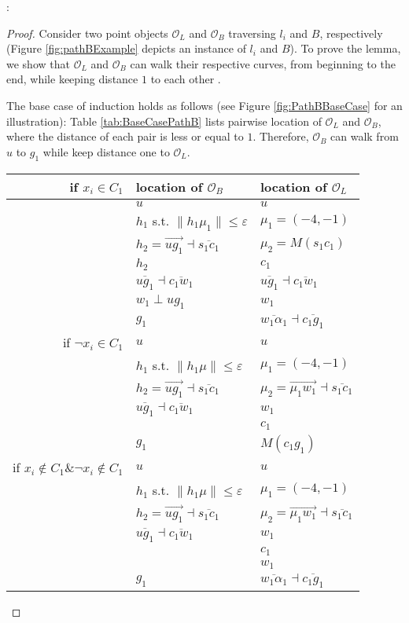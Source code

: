 \documentclass[a4paper,UKenglish]{lipics}
\newcommand{\eps}{\varepsilon}
\newcommand{\CS}{{\mathscr S}}
\newcommand{\CO}{{\mathscr O}}
\newcommand{\CQ}{{\mathscr Q}}
\newcommand{\cfev}{{l}} \newcommand{\sq}{{\CS\CQ}}
\newcommand{\Seg}[1]{{\overline{#1}}}
\newcommand{\Dir}{\overrightarrow}
\begin{document}
:
\begin{proof}
Consider two point objects $\CO_L$ and $\CO_B$ 
traversing $\cfev_i$ and $B$, respectively (Figure \ref{fig:pathBExample} depicts an instance of $\cfev_i$ and $B$).
To prove the lemma, we show that $\CO_L$ and $\CO_B$ can walk
their respective curves, from beginning to
the end, while keeping distance $1$ to each other
. 

The base case of induction holds as follows 
(see Figure \ref{fig:PathBBaseCase} for an illustration):
Table \ref{tab:BaseCasePathB} lists  pairwise location of 
$\CO_L$ and $\CO_B$, where the distance of each pair is less or equal to $1$.
Therefore, $\CO_B$ can walk from $u$ to $g_1$ while
keep distance one to $\CO_L$.

\begin{table}[h]
\centering
\begin{tabular}{ r | l | l  }
if $x_i \in C_1$   & location of $\CO_B$ & location of $\CO_L$  
 \\
\hline
    
&  $u$ & $u$  \\
&  				 $h_1$ s.t.  $\| h_1\mu_1 \| \le \eps$ & $\mu_1 = (-4,-1)$\\

				&    $h_2 = \Dir{ug_1} \dashv	 \Seg{s_1c_1} $ & $\mu_2 = M(s_1c_1)$   \\
&  				 			      $h_2 $ & $c_1$  \\
&    $\Seg{ug_1} \dashv \Seg{c_1w_1}$ &  $\Seg{ug_1} \dashv \Seg{c_1w_1}$ \\
&  				 		     $w_1 \perp ug_1 $ &   $w_1$  \\
& $g_1 $  & $\Seg{w_1\alpha_1}	\dashv \Seg{c_1g_1}$	      \\

\hline
if $\neg x_i \in C_1$ 
&  $u$ & $u$  \\
&  				 $h_1$ s.t.  $\| h_1\mu \| \le \eps$ & $\mu_1 = (-4,-1)$\\
& $h_2 = \Dir{ug_1} \dashv	 \Seg{s_1c_1} $ &  $\mu_2 = \Dir{\mu_1w_1} \dashv	 \Seg{s_1c_1} $\\
& $\Seg{ug_1} \dashv \Seg{c_1w_1}$ & $w_1$ \\
&  &  $c_1$\\
& $g_1$ &  $M(c_1g_1)$\\

\hline
if $x_i \notin C_{1} \& \neg x_i \notin C_{1}$ & $u$ & $u$  \\
&  				 $h_1$ s.t.  $\| h_1\mu \| \le \eps$ & $\mu_1 = (-4,-1)$\\
& $h_2 = \Dir{ug_1} \dashv	 \Seg{s_1c_1} $ &  $\mu_2 = \Dir{\mu_1w_1} \dashv	 \Seg{s_1c_1} $\\
& $\Seg{ug_1} \dashv \Seg{c_1w_1}$ & $w_1$ \\
&  &  $c_1$\\
&  &  $w_1$\\
& $g_1 $  & $\Seg{w_1\alpha_1}	\dashv \Seg{c_1g_1}$	      \\


\end{tabular}
\end{table}
\end{proof}
\end{document}
